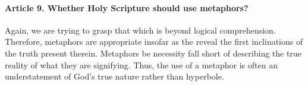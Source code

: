 \documentclass{ucetd}
\begin{document}
\paragraph{Article 9. Whether Holy Scripture should use metaphors?}
Again, we are trying to grasp that which is beyond logical comprehension. Therefore, metaphors are appropriate insofar as the reveal the first inclinations of the truth present therein. Metaphors be necessity fall short of describing the true reality of what they are signifying. Thus, the use of a metaphor is often an understatement of God's true nature rather than hyperbole.
\end{document}
